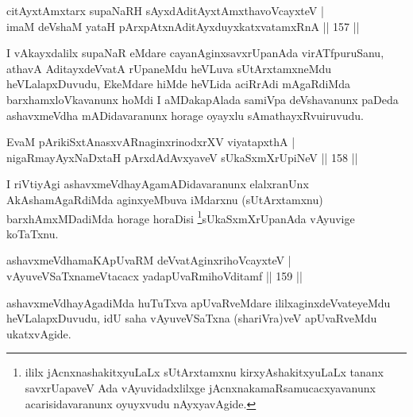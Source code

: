 
\begin{shl}
citAyxtAmx\s tarx supaNaRH sAyxdAditAyxtAmx\s thavoVcayxteV |\\
imaM deVshaM yataH pArxpAtxnAditAyxduyxkatxvatamxRnA \hfill || 157 ||
\end{shl}

\begin{artha}
I vAkayxdalilx supaNaR eMdare cayanAginxsavxrUpanAda virATfpuruSanu, athavA AditayxdeVvatA rUpaneMdu heVLuva sUtArxtamxneMdu heVLalapxDuvudu, EkeMdare hiMde heVLida aciRrAdi mAgaRdiMda barxhamxloVkavanunx hoMdi I aMDakapAlada samiVpa deVshavanunx paDeda ashavxmeVdha mADidavaranunx horage oyayxlu sAmathayxRvu\break iruvudu.
\end{artha}

\begin{shl}
\footnotemark{}EvaM pArikiSxtAnasxvARnaginxrinodxrXV viyatapxthA |\\
nigaRmayAyxNaDxtaH pArxdAdAvxyaveV sUkaSxmXrUpiNeV \hfill || 158 ||
\end{shl}

\begin{artha}
I riVtiyAgi ashavxmeVdhayAgamADidavaranunx elalxranUnx AkAshamAgaRdiMda aginxyeMbuva iMdarxnu (sUtArxtamxnu) barxhAmxMDadiMda horage horaDisi \footnote{ililx jAcnxnashakitxyuLaLx sUtArxtamxnu kirxyAshakitxyuLaLx tananx savxrUapaveV Ada vAyuvidadxlilxge jAcnxnakamaRsamucacxyavanunx acarisidavaranunx oyuyxvudu nAyxyavAgide.}sUkaSxmXrUpanAda vAyuvige koTaTxnu.
\end{artha}


\begin{shl}
ashavxmeVdhamaKApUvaRM deVvatA\s ginxrihoVcayxteV |\\
vAyuveVSaTxnameVtacacx yadapUvaRmihoVditamf \hfill || 159 ||
\end{shl}

\begin{artha}
ashavxmeVdhayAgadiMda huTuTxva apUvaRveMdare ililx\break aginxdeVvateyeMdu heVLalapxDuvudu, idU saha vAyuveVSaTxna (shariVra)veV apUvaRveMdu ukatxvAgide.
\end{artha}

